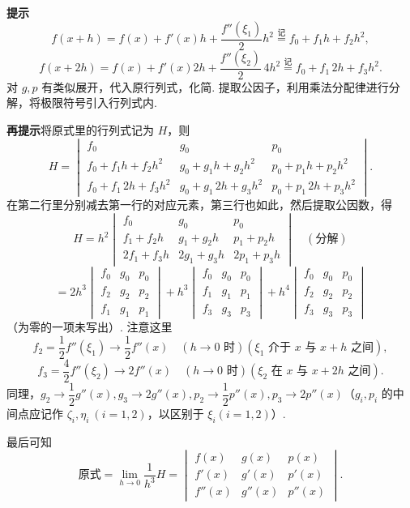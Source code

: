 \documentclass[UTF8, 12pt, fontset=fandol, oneside]{ctexart}
\begin{document}
\noindent\textbf{提示}\quad
\[
  f(x+h)=f(x)+f'(x)h+\frac{f''(\xi_1)}2h^2\overset{\text{记}}{=}f_0+f_1h+f_2h^2,
\]
\[
  f(x+2h)=f(x)+f'(x)2h+\frac{f''(\xi_2)}2\,4h^2
  \overset{\text{记}}{=}f_0+f_1\,2h+f_3h^2.
\]
对 $g,p$ 有类似展开，代入原行列式，化简. 提取公因子，利用乘法分配律进行分解，将极限符号引入行列式内.

\noindent\textbf{再提示}\quad 将原式里的行列式记为 $H$，则
\[
  H=
  \begin{vmatrix}
  f_0&g_0&p_0\\
  f_0+f_1h+f_2h^2&g_0+g_1h+g_2h^2&p_0+p_1h+p_2h^2\\
  f_0+f_1\,2h+f_3h^2&g_0+g_1\,2h+g_3h^2&p_0+p_1\,2h+p_3h^2
  \end{vmatrix}.
\]
在第二行里分别减去第一行的对应元素，第三行也如此，然后提取公因数，得
\[
  H=h^2
  \begin{vmatrix}
  f_0&g_0&p_0\\
  f_1+f_2h&g_1+g_2h&p_1+p_2h\\
  2f_1+f_3h&2g_1+g_3h&2p_1+p_3h
  \end{vmatrix}\quad(\text{分解})
\]
\[
  =2h^3
  \begin{vmatrix}
  f_0&g_0&p_0\\
  f_2&g_2&p_2\\
  f_1&g_1&p_1
  \end{vmatrix}
  +h^3
  \begin{vmatrix}
  f_0&g_0&p_0\\
  f_1&g_1&p_1\\
  f_3&g_3&p_3
  \end{vmatrix}
  +h^4
  \begin{vmatrix}
  f_0&g_0&p_0\\
  f_2&g_2&p_2\\
  f_3&g_3&p_3
  \end{vmatrix}
\]
（为零的一项未写出）. 注意这里
\[
  f_2=\frac12f''(\xi_1)\to\frac12f''(x)\quad(h\to0\text{ 时})(\xi_1\text{ 介于 }x\text{ 与 }x+h\text{ 之间}),
\]
\[
  f_3=\frac42f''(\xi_2)\to2f''(x)\quad(h\to0\text{ 时})(\xi_2\text{ 在 }x\text{ 与 }x+2h\text{ 之间}).
\]
同理，$g_2\to\dfrac12g''(x),g_3\to2g''(x),p_2\to\dfrac12p''(x),p_3\to2p''(x)$（$g_i,p_i$ 的中间点应记作 $\zeta_i,\eta_i\ (i=1,2)$，以区别于 $\xi_i(i=1,2)$）.

最后可知
\[
  \text{原式}=\lim_{h\to0}\frac1{h^3}H=
  \begin{vmatrix}
  f(x)&g(x)&p(x)\\
  f'(x)&g'(x)&p'(x)\\
  f''(x)&g''(x)&p''(x)
  \end{vmatrix}.
\]
\end{document}

